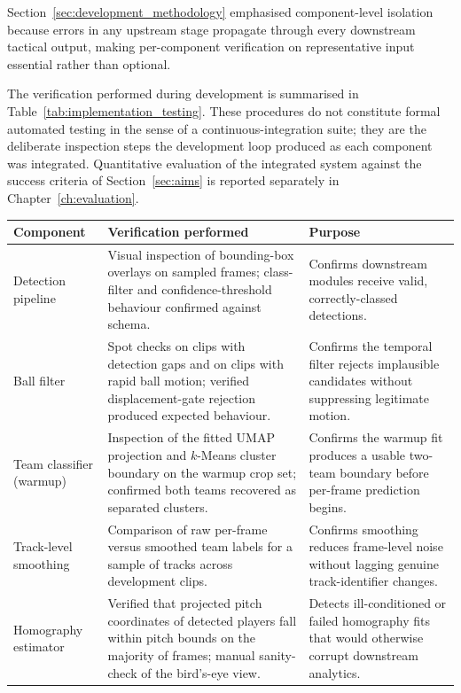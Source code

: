 Section~\ref{sec:development_methodology} emphasised component-level
isolation because errors in any upstream stage propagate through every
downstream tactical output, making per-component verification on
representative input essential rather than optional.

The verification performed during development is summarised in
Table~\ref{tab:implementation_testing}. These procedures do not constitute
formal automated testing in the sense of a continuous-integration suite;
they are the deliberate inspection steps the development loop produced as
each component was integrated. Quantitative evaluation of the integrated
system against the success criteria of Section~\ref{sec:aims} is reported
separately in Chapter~\ref{ch:evaluation}.

\begin{table}[!htbp]
\centering
\small
\renewcommand{\arraystretch}{1.2}
\begin{tabular}{
  >{\raggedright\arraybackslash}p{3.0cm}
  >{\raggedright\arraybackslash}p{6.4cm}
  >{\raggedright\arraybackslash}p{4.0cm}
}
\toprule
\textbf{Component} & \textbf{Verification performed} & \textbf{Purpose} \\
\midrule
Detection pipeline & Visual inspection of bounding-box overlays on sampled frames; class-filter and confidence-threshold behaviour confirmed against schema. & Confirms downstream modules receive valid, correctly-classed detections. \\
Ball filter & Spot checks on clips with detection gaps and on clips with rapid ball motion; verified displacement-gate rejection produced expected behaviour. & Confirms the temporal filter rejects implausible candidates without suppressing legitimate motion. \\
Team classifier (warmup) & Inspection of the fitted UMAP projection and $k$-Means cluster boundary on the warmup crop set; confirmed both teams recovered as separated clusters. & Confirms the warmup fit produces a usable two-team boundary before per-frame prediction begins. \\
Track-level smoothing & Comparison of raw per-frame versus smoothed team labels for a sample of tracks across development clips. & Confirms smoothing reduces frame-level noise without lagging genuine track-identifier changes. \\
Homography estimator & Verified that projected pitch coordinates of detected players fall within pitch bounds on the majority of frames; manual sanity-check of the bird's-eye view. & Detects ill-conditioned or failed homography fits that would otherwise corrupt downstream analytics. \\

\end{tabular}
\end{table}
